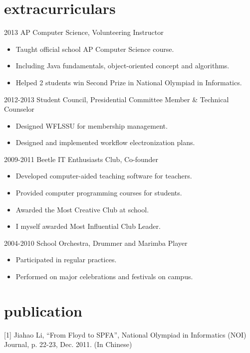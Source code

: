 \documentclass[]{friggeri-cv} %
\newenvironment{citemize}{\begin{itemize}[leftmargin=12pt]\vspace{-10pt}}{\end{itemize}}
\begin{document}
\section{extracurriculars}

\begin{entrylist}
\entry
{2013}
{AP Computer Science, Volunteering Instructor}
{}
{\begin{citemize}
  \item{Taught official school AP Computer Science course. }
  \item{Including Java fundamentals, object-oriented concept and algorithms. }
  \item{Helped 2 students win Second Prize in National Olympiad in Informatics. }
\end{citemize}}
\entry
{2012-2013}
{Student Council, Presidential Committee Member \& Technical Counselor}
{}
{\begin{citemize}
    \item{Designed WFLSSU for membership management. }
    \item{Designed and implemented workflow electronization plans. }
  \end{citemize}}
\entry
{2009-2011}
{Beetle IT Enthusiasts Club, Co-founder}
{}
{\begin{citemize}
    \item{Developed computer-aided teaching software for teachers. }
    \item{Provided computer programming courses for students. }
    \item{Awarded the Most Creative Club at school. }
    \item{I myself awarded Most Influential Club Leader. }
  \end{citemize}}

\entry
{2004-2010}
{School Orchestra, Drummer and Marimba Player}
{}
{\begin{citemize}
  \item{Participated in regular practices. }
  \item{Performed on major celebrations and festivals on campus. }
\end{citemize}}
\end{entrylist}


\section{publication}

[1] Jiahao Li, ``From Floyd to SPFA'', National Olympiad in Informatics (NOI) Journal, p. 22-23, Dec. 2011. (In Chinese)

\end{document}
